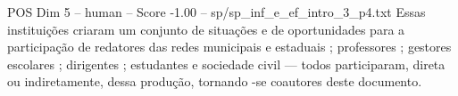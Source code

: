 \begin{textsample}{POS Dim 5 – human – Score -1.00 – sp/sp\_inf\_e\_ef\_intro\_3\_p4.txt}  \label{ex:f5_pos_016}
Essas instituições criaram um conjunto de situações e de oportunidades para a participação de redatores das redes municipais e estaduais ; professores ; gestores escolares ; dirigentes ; estudantes e sociedade civil — todos participaram, direta ou indiretamente, dessa produção, tornando -se coautores deste documento.

\end{textsample}
